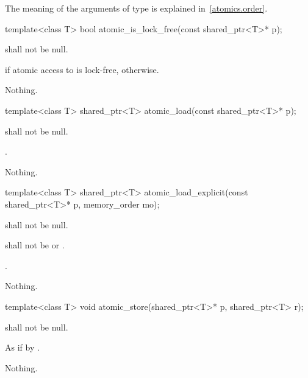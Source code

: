\pnum
The meaning of the arguments of type  is explained in~\ref{atomics.order}.

%
\begin{itemdecl}
template<class T> bool atomic_is_lock_free(const shared_ptr<T>* p);
\end{itemdecl}

\begin{itemdescr}
\pnum
\requires {} shall not be null.

\pnum
\returns
{} if atomic access to  is lock-free,  otherwise.

\pnum
\throws
Nothing.
\end{itemdescr}

%
\begin{itemdecl}
template<class T> shared_ptr<T> atomic_load(const shared_ptr<T>* p);
\end{itemdecl}

\begin{itemdescr}
\pnum
\requires {} shall not be null.

\pnum
\returns
{}.

\pnum
\throws
Nothing.
\end{itemdescr}

%
\begin{itemdecl}
template<class T> shared_ptr<T> atomic_load_explicit(const shared_ptr<T>* p, memory_order mo);
\end{itemdecl}

\begin{itemdescr}
\pnum
\requires {} shall not be null.

\pnum
\requires {} shall not be  or .

\pnum
\returns
{}.

\pnum
\throws
Nothing.
\end{itemdescr}

%
\begin{itemdecl}
template<class T> void atomic_store(shared_ptr<T>* p, shared_ptr<T> r);
\end{itemdecl}

\begin{itemdescr}
\pnum
\requires {} shall not be null.

\pnum
\effects
As if by .

\pnum
\throws
Nothing.
\end{itemdescr}

